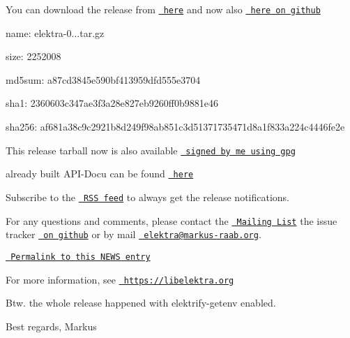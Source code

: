 You can download the release from \href{https://www.libelektra.org/ftp/elektra/releases/elektra-0.8.14.tar.gz}{\texttt{ here}} and now also \href{https://github.com/ElektraInitiative/ftp/tree/master/releases/elektra-0.8.14.tar.gz}{\texttt{ here on github}}


\begin{DoxyItemize}
\item name\+: elektra-\/0...\+tar.\+gz
\item size\+: 2252008
\item md5sum\+: a87cd3845e590bf413959dfd555e3704
\item sha1\+: 2360603c347ae3f3a28e827eb9260ff0b9881e46
\item sha256\+: af681a38c9c2921b8d249f98ab851c3d51371735471d8a1f833a224c4446fe2e
\end{DoxyItemize}

This release tarball now is also available \href{https://www.libelektra.org/ftp/elektra/releases/elektra-0.8.14.tar.gz.gpg}{\texttt{ signed by me using gpg}}

already built A\+P\+I-\/\+Docu can be found \href{https://doc.libelektra.org/api/0.8.14/html/}{\texttt{ here}}

Subscribe to the \href{https://doc.libelektra.org/news/feed.rss}{\texttt{ R\+SS feed}} to always get the release notifications.

For any questions and comments, please contact the \href{https://lists.sourceforge.net/lists/listinfo/registry-list}{\texttt{ Mailing List}} the issue tracker \href{https://git.libelektra.org/issues}{\texttt{ on github}} or by mail \href{mailto:elektra@markus-raab.org}{\texttt{ elektra@markus-\/raab.\+org}}.

\href{https://doc.libelektra.org/news/519cbfac-6db5-4594-8a38-dec4c84b134f.html}{\texttt{ Permalink to this N\+E\+WS entry}}

For more information, see \href{https://libelektra.org}{\texttt{ https\+://libelektra.\+org}}

Btw. the whole release happened with elektrify-\/getenv enabled.

Best regards, Markus 